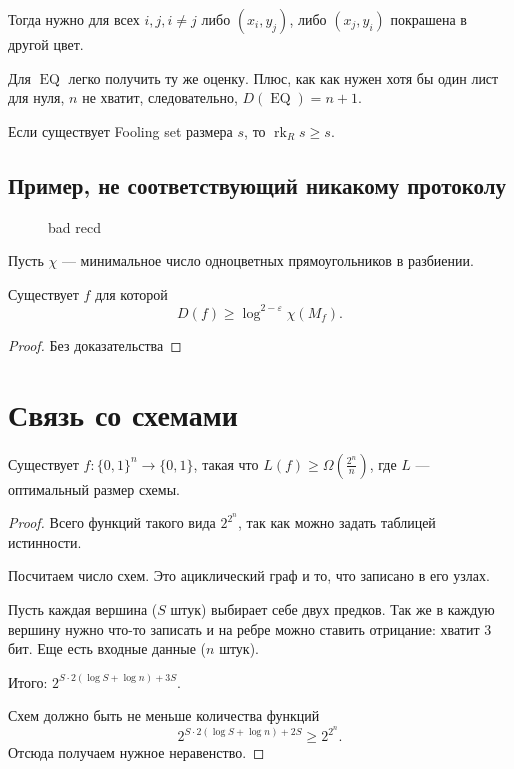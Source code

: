 Тогда нужно для всех $ i, j, i \ne j$ либо $ (x_i, y_j)$, либо  $ (x_j, y_i)$ покрашена в другой цвет.

Для $ \operatorname{EQ}$ легко получить ту же оценку. Плюс, как как нужен хотя бы один лист для нуля, $ n$ не хватит, следовательно,  $ D(\operatorname{EQ}) = n+1$.

\begin{thm}
	Если существует Fooling set размера $ s$, то $ \operatorname{rk}_R s \ge s$.
\end{thm}

\subsection{Пример, не соответствующий никакому протоколу}
\begin{figure}[ht]
    \centering
    \caption{bad recd}
    \label{fig:bad-rect}
\end{figure}
Пусть $ \chi$ --- минимальное число одноцветных прямоугольников в разбиении.
\begin{thm}[GPW, 16]
	Существует $ f$ для которой
	 \[
		 D(f) \ge \log^{2 - \varepsilon } \chi (M_f)
	.\] 
\end{thm}
\begin{proof}
    Без доказательства
\end{proof}
 

\section{Связь со схемами}
\begin{thm}[Шеннон]
	Существует $ f \colon \{0, 1\}^{n} \to  \{0, 1\}$, такая что $ L(f) \ge \Omega\left( \tfrac{2^{n}}{n} \right) $, где $ L$ --- оптимальный размер схемы.
\end{thm}
\begin{proof}
    Всего функций такого вида $ 2^{2^{n}}$, так как можно задать таблицей истинности.

	Посчитаем число схем. Это ациклический граф и то, что записано в его узлах.

	Пусть каждая вершина ($ S$ штук) выбирает себе двух предков. Так же в каждую вершину нужно что-то записать и на ребре можно ставить отрицание: хватит $ 3$ бит. Еще есть входные данные ($ n$ штук).

	Итого: $2^{ S \cdot 2 (\log S + \log n) + 3S}$.

	Схем должно быть не меньше  количества функций
	\[
		2^{S \cdot  2( \log S + \log n) + 2 S} \ge  2^{2^n}
	.\] 
	Отсюда получаем нужное неравенство.
\end{proof}

